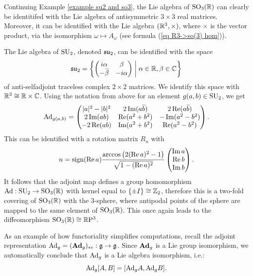 \begin{example}\label{example Lie algebras of so3 and su2}
    Continuing Example \ref{example su2 and so3}, 
    the Lie algebra of $\operatorname{SO}_3(\mathbb{R})$ can clearly be identitifed with the Lie algebra of antisymmetric $3\times 3$ real matrices. Moreover, it can be identified with the Lie algebra $(\mathbb{R}^3,\times)$, where $\times$ is the vector product, via the isomorphism $\omega\mapsto A_{\omega}$ (see formula (\ref{eq R3->so(3) hom})). 
    
    The Lie algebra of $\operatorname{SU}_2$, denoted $\mathfrak{su}_2$, can be identified with the space
    \[\fraksu_2=\left\{
    \begin{pmatrix}
        i\alpha&\beta\\-\wb{\beta}&-i\alpha
    \end{pmatrix}
    \middle| \alpha\in\bbR,\beta\in\bbC
    \right\}\]
    of anti-selfadjoint traceless complex $2\times 2$ matrices. We identify this space with $\mathbb{R}^3\cong \mathbb{R}\times \mathbb{C}$. Using the notation from above for an element $g(a,b)\in\operatorname{SU}_2$, we get
    \[\Ad_{g(a,b)}=
    \begin{pmatrix}
        |a|^2-|b|^2&2\Im (a\wb{b}) & 2\Re(a\wb{b}) \\
        2\Im(ab) & \Re(a^2+b^2) & -\Im(a^2-b^2)\\
        -2\Re(ab) & \Im(a^2+b^2) & \Re(a^2-b^2)
    \end{pmatrix}.\label{eq Ad: su2->so3}
    \]
    This can be identified with a rotation matrix $R_n$ with
    \[n=\operatorname{sign}(\operatorname{Re} a)\frac{\arccos\left(2(\operatorname{Re} a)^2-1\right)}{\sqrt{1-(\operatorname{Re} a)^2}}
    \begin{pmatrix}
        \operatorname{Im} a\\ \operatorname{Re} b \\ \operatorname{Im} b
    \end{pmatrix}.
    \]
    It follows that the adjoint map defines a group homomorphism $\mathrm{Ad}:\operatorname{SU}_2\to \operatorname{SO}_3(\mathbb{R})$ with kernel equal to $\{\pm I\}\cong \mathbb{Z}_2$, therefore this is a two-fold covering of $\operatorname{SO}_3(\mathbb{R})$ with the 3-sphere, where antipodal points of the sphere are mapped to the same element of $\operatorname{SO}_3(\mathbb{R})$. This once again leads to the diffeomorphism $\operatorname{SO}_3(\mathbb{R})\cong \mathbb{R}\mathrm{P}^3$.
\end{example}



\begin{example}
    As an example of how functoriality simplifies computations, recall the adjoint representation $\mathrm{Ad}_g=(\mathrm{\mathbf{Ad}}_g)_{\ast e}:\mathfrak{g}\to \mathfrak{g}$. Since $\mathrm{\mathbf{Ad}}_g$ is a Lie group isomorphism, we automatically conclude that $\mathrm{Ad}_g$ is a Lie algebra isomorphism, i.e.:
    \[\mathrm{Ad}_g[A,B]=[\mathrm{Ad}_g A,\mathrm{Ad}_g B].\]
\end{example}

